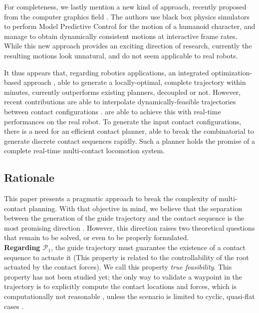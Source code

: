 For completeness, we lastly mention a new kind of approach, recently proposed from the computer graphics field \citep{hamalainen_cpbp_2015}. The authors
use black box physics simulators to perform Model Predictive Control for the motion of a humanoid character, and manage to obtain dynamically consistent motions
at interactive frame rates. While this new approach provides an exciting direction of research, currently the resulting motions
look unnatural, and do not seem applicable to real robots.

It thus appears that, regarding robotics applications, an integrated optimization-based approach \citep{Mordatch:2012:DCB:2185520.2185539}, able to generate a locally-optimal, complete trajectory within minutes, currently outperforms existing planners, decoupled or not. However, recent contributions are able to interpolate dynamically-feasible
trajectories between contact configurations \citep{herzog2015trajectory, Park116, Carpentier2016}. \citeauthor{Carpentier2016} are able to achieve this with real-time performances on the real robot.
To generate the input contact configurations, there is a need for an efficient contact planner, able to break the combinatorial to generate discrete contact sequences rapidly. 
Such a planner holds the promise of a complete real-time multi-contact locomotion system.

\subsection{Rationale}
This paper presents a pragmatic approach to break the complexity of multi-contact planning. With that objective in mind,
we believe that the separation between the generation of the guide trajectory and the contact sequence is the most promising direction \citep{DBLP:conf/iser/EscandeKMG08}.
However, this direction raises two theoretical questions that remain to be solved, or even to be properly formulated. \\

\noindent \textbf{Regarding $\mathcal{P}_1$}, the guide trajectory must guarantee the existence of a contact sequence to actuate it (This property is related to the controllability of the root actuated by the contact forces). We call this property \textit{true feasibility}. This property has not been studied yet; the only way to validate a waypoint in the trajectory is to explicitly compute the contact locations and forces, which is computationally not reasonable \citep{Bouyarmane2009}, unless the scenario is limited to cyclic, quasi-flat cases \citep{zucker2010optimization}. \\

